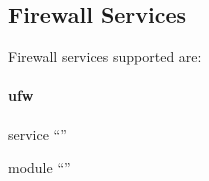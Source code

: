\subsection{Firewall Services}

Firewall services supported are:

\paragraph{ufw}

\begin{compactitem}
\item service ``''
\item module ``''
\end{compactitem}


